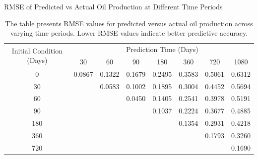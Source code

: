 \begin{table}
    \centering
    \caption{RMSE of Predicted vs Actual Oil Production at Different Time Periods}
    \label{tab:rmse_oil}
    \begin{tabular}{c|ccccccc}
        \toprule
        \multirow{2}{*}{Initial Condition (Days)} & \multicolumn{7}{c}{Prediction Time (Days)} \\
        \cmidrule{2-8}
        & 30 & 60 & 90 & 180 & 360 & 720 & 1080 \\
        \midrule
        0   & 0.0867 & 0.1322 & 0.1679 & 0.2495 & 0.3583 & 0.5061 & 0.6312 \\
        30   &  & 0.0583 & 0.1002 & 0.1895 & 0.3004 & 0.4452 & 0.5694 \\
        60   &  &  & 0.0450 & 0.1405 & 0.2541 & 0.3978 & 0.5191 \\
        90   &  &  &  & 0.1037 & 0.2224 & 0.3677 & 0.4885 \\
        180   &  &  &  &  & 0.1354 & 0.2931 & 0.4218 \\
        360   &  &  &  &  &  & 0.1793 & 0.3260 \\
        720   &  &  &  &  &  &  & 0.1690 \\
        \bottomrule
    \end{tabular}
    \vspace{0.2cm}
    \caption*{The table presents RMSE values for predicted versus actual oil production across varying time periods. Lower RMSE values indicate better predictive accuracy.}
\end{table}